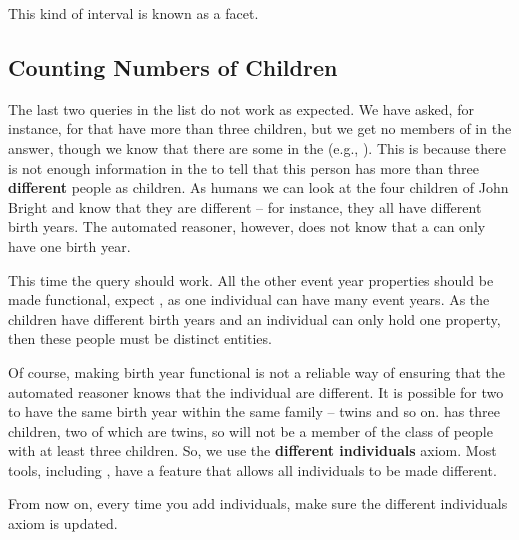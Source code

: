 This kind of interval is known as a facet.

\subsection{Counting Numbers of Children}
\label{sec:countchildren}

The last two queries in the list do not work as expected. We have asked, for instance, for \person that have more than three children, but we get no members of \person in the answer, though we know that there are some in the \fhkb (e.g., \ijb). This is because there is not enough information in the \fhkb to tell that this person has more than three \textbf{different} people as children. As humans we can look at the four children of John Bright and know that they are different -- for instance, they all have different birth years. The automated reasoner, however, does not know that a \person can only have one birth year.


This time the query should work. All the other event year properties should be made functional, expect , as one individual can have many event years. As the children have different birth years and an individual can only hold one  property, then these people must be distinct entities.

Of course, making birth year functional is not a reliable way of ensuring that the automated reasoner knows that the individual are different. It is possible for two \person to have the same birth year within the same family -- twins and so on. \ipwb has three children, two of which are twins, so will not be a member of the class of people with at least three children. So, we use the \textbf{different individuals} axiom. Most tools, including \protege, have a feature that allows all individuals to be made different.


From now on, every time you add individuals, make sure the different individuals axiom is updated.

